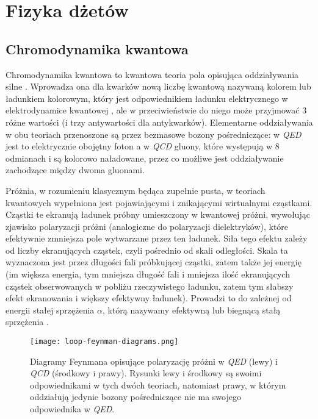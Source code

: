 \section{Fizyka dżetów}


\subsection{Chromodynamika kwantowa}

Chromodynamika kwantowa  to kwantowa teoria pola opisująca oddziaływania silne \cite{perkins_2005}. Wprowadza ona dla kwarków nową liczbę kwantową nazywaną kolorem lub ładunkiem kolorowym, który jest odpowiednikiem ładunku elektrycznego w elektrodynamice kwantowej , ale w przeciwieństwie do niego może przyjmować 3 różne wartości (i trzy antywartości dla antykwarków). Elementarne oddziaływania w obu teoriach przenoszone są przez bezmasowe bozony pośredniczące: w \textit{QED} jest to elektrycznie obojętny foton a w \textit{QCD} gluony, które występują w 8 odmianach i są kolorowo naładowane, przez co możliwe jest oddziaływanie zachodzące między dwoma gluonami.

Próżnia, w rozumieniu klasycznym będąca zupełnie pusta, w teoriach kwantowych wypełniona jest pojawiającymi i znikającymi wirtualnymi cząstkami. Cząstki te ekranują ładunek próbny umieszczony w kwantowej próżni, wywołując zjawisko polaryzacji próżni (analogiczne do polaryzacji dielektryków), które efektywnie zmniejsza pole wytwarzane przez ten ładunek. 
Siła tego efektu zależy od liczby ekranujących cząstek, czyli pośrednio od skali odległości. Skala ta wyznaczona jest przez długości fali próbkującej cząstki, zatem także jej energię (im większa energia, tym mniejsza długość fali i mniejsza ilość ekranujących cząstek obserwowanych w pobliżu rzeczywistego ładunku, zatem tym słabszy efekt ekranowania i większy efektywny ładunek). Prowadzi to do zależnej od energii stałej sprzężenia $\alpha$, którą nazywamy  efektywną lub biegnącą stałą sprzężenia . 


\begin{figure}[h]
	\centering
	\texttt{[image: loop-feynman-diagrams.png]}
	\caption{Diagramy Feynmana opisujące polaryzację próżni w \textit{QED} (lewy) i \textit{QCD} (środkowy i prawy). Rysunki lewy i środkowy są swoimi odpowiednikami w tych dwóch teoriach, natomiast prawy, w którym oddziałują jedynie bozony pośredniczące nie ma swojego odpowiednika w \textit{QED}. }
	\label{fig:feynman-diagrams}
\end{figure}

